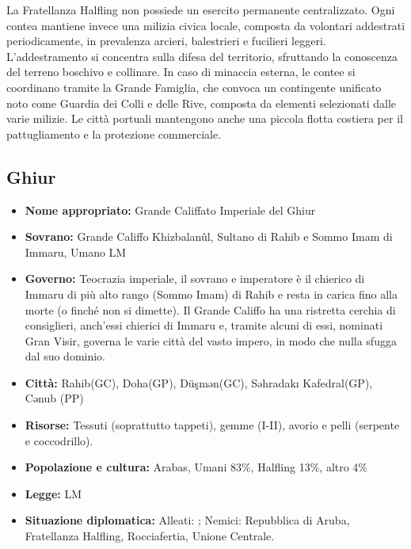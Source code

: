 \documentclass[10pt, a4paper]{report}
\begin{document}
\begin{multicols}{2}
La Fratellanza Halfling non possiede un esercito permanente centralizzato. Ogni contea mantiene invece una milizia civica locale, composta da volontari addestrati periodicamente, in prevalenza arcieri, balestrieri e fucilieri leggeri. L’addestramento si concentra sulla difesa del territorio, sfruttando la conoscenza del terreno boschivo e collinare. In caso di minaccia esterna, le contee si coordinano tramite la Grande Famiglia, che convoca un contingente unificato noto come Guardia dei Colli e delle Rive, composta da elementi selezionati dalle varie milizie.
Le città portuali mantengono anche una piccola flotta costiera per il pattugliamento e la protezione commerciale.

\subsection*{Ghiur}
\begin{itemize}
	\item \textbf{Nome appropriato:} Grande Califfato Imperiale del Ghiur
	\item \textbf{Sovrano:} Grande Califfo Khizbalanûl, Sultano di Rahib e Sommo Imam di Immaru, Umano LM
	\item \textbf{Governo:} Teocrazia imperiale, il sovrano e imperatore è il chierico di Immaru di più alto rango (Sommo Imam) di Rahib e resta in carica fino alla morte (o finché non si dimette). Il Grande Califfo ha una ristretta cerchia di consiglieri, anch’essi chierici di Immaru e, tramite alcuni di essi, nominati Gran Visir, governa le varie città del vasto impero, in modo che nulla sfugga dal suo dominio.
	\item \textbf{Città:} Rahib(GC), Doha(GP), Düşmən(GC), Səhradakı Kafedral(GP), Cənub (PP)
	\item \textbf{Risorse:} Tessuti (soprattutto tappeti), gemme (I-II), avorio e pelli (serpente e coccodrillo).
	\item \textbf{Popolazione e cultura:} Arabas, Umani 83\%, Halfling 13\%, altro 4\%
	\item \textbf{Legge:} LM
	\item \textbf{Situazione diplomatica:} Alleati: ; Nemici: Repubblica di Aruba, Fratellanza Halfling, Rocciafertia, Unione Centrale.
\end{itemize}

\end{multicols}
\end{document}
